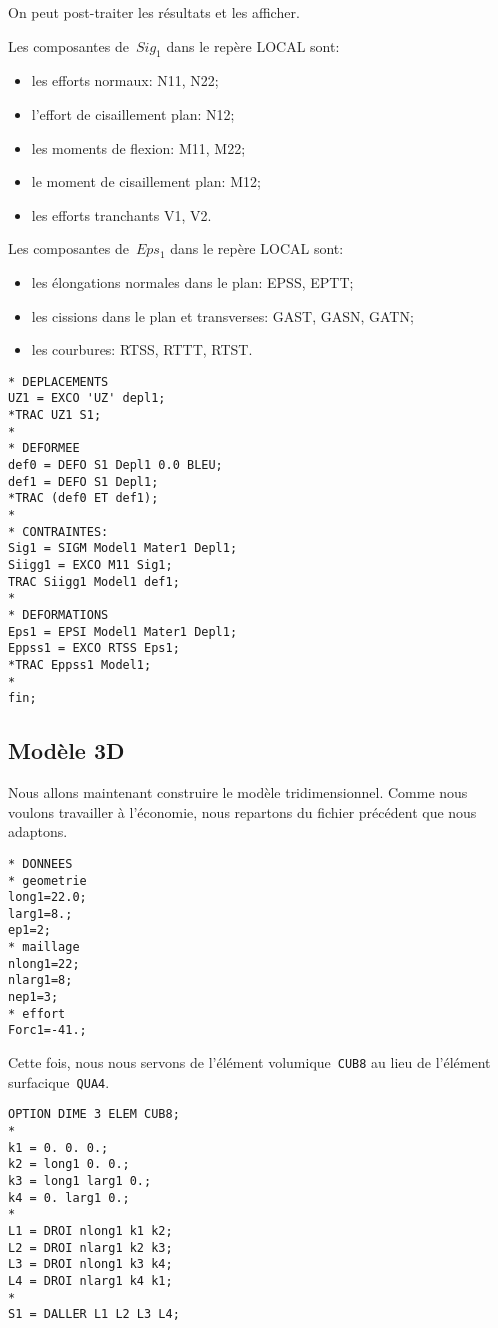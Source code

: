 On peut post-traiter les résultats et les afficher.

Les composantes de~$Sig_1$ dans le repère LOCAL sont:
\begin{itemize}
  \item les efforts normaux: N11, N22;
  \item l'effort de cisaillement plan: N12; 
  \item les moments de flexion: M11, M22;
  \item le moment de cisaillement plan: M12;
  \item les efforts tranchants V1, V2.
\end{itemize}

Les composantes de~$Eps_1$ dans le repère LOCAL sont:
\begin{itemize}
  \item les élongations normales dans le plan: EPSS, EPTT;
  \item les cissions dans le plan et transverses: GAST, GASN, GATN;
  \item les courbures: RTSS, RTTT, RTST.
\end{itemize}
\begin{lstlisting}[firstnumber=last]
* DEPLACEMENTS
UZ1 = EXCO 'UZ' depl1;
*TRAC UZ1 S1;
*
* DEFORMEE
def0 = DEFO S1 Depl1 0.0 BLEU;
def1 = DEFO S1 Depl1;
*TRAC (def0 ET def1);
*
* CONTRAINTES: 
Sig1 = SIGM Model1 Mater1 Depl1;
Siigg1 = EXCO M11 Sig1;
TRAC Siigg1 Model1 def1;
*
* DEFORMATIONS
Eps1 = EPSI Model1 Mater1 Depl1;
Eppss1 = EXCO RTSS Eps1;
*TRAC Eppss1 Model1;
*
fin;
\end{lstlisting}

\medskip
\subsection{Modèle 3D}

Nous allons maintenant construire le modèle tridimensionnel. Comme nous voulons travailler à l'économie, nous repartons du fichier précédent que nous adaptons.
\begin{lstlisting}[firstnumber=1]
* DONNEES
* geometrie
long1=22.0;
larg1=8.;
ep1=2;
* maillage
nlong1=22;
nlarg1=8;
nep1=3;
* effort
Forc1=-41.;
\end{lstlisting}

Cette fois, nous nous servons de l'élément volumique~\lstinline!CUB8! au lieu de l'élément surfacique~\lstinline!QUA4!.
\begin{lstlisting}[firstnumber=last]
OPTION DIME 3 ELEM CUB8;
*
k1 = 0. 0. 0.;
k2 = long1 0. 0.;
k3 = long1 larg1 0.;
k4 = 0. larg1 0.;
*
L1 = DROI nlong1 k1 k2;
L2 = DROI nlarg1 k2 k3;
L3 = DROI nlong1 k3 k4;
L4 = DROI nlarg1 k4 k1;
*
S1 = DALLER L1 L2 L3 L4;
\end{lstlisting}

